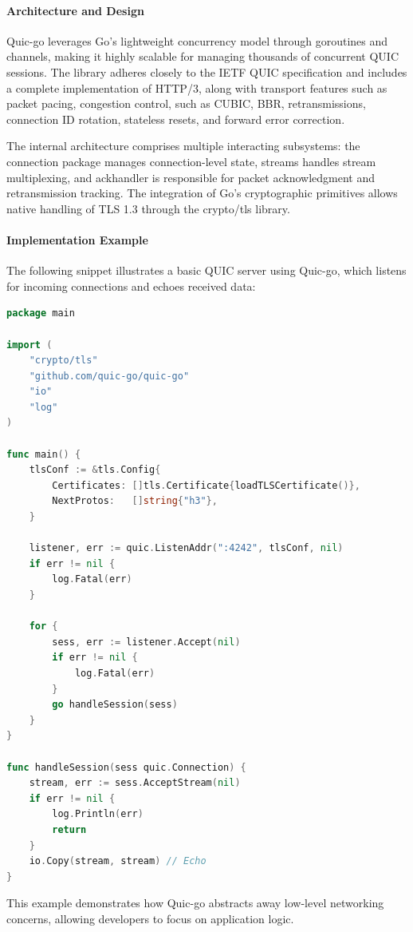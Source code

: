 \paragraph{Architecture and Design}
Quic-go leverages Go's lightweight concurrency model through goroutines and channels, making it highly scalable for managing thousands of concurrent QUIC sessions. The library adheres closely to the IETF QUIC specification and includes a complete implementation of HTTP/3, along with transport features such as packet pacing, congestion control, such as CUBIC, BBR, retransmissions, connection ID rotation, stateless resets, and forward error correction.

The internal architecture comprises multiple interacting subsystems: the connection package manages connection-level state, streams handles stream multiplexing, and ackhandler is responsible for packet acknowledgment and retransmission tracking. The integration of Go's cryptographic primitives allows native handling of TLS 1.3 through the crypto/tls library.

\paragraph{Implementation Example}
The following snippet illustrates a basic QUIC server using Quic-go, which listens for incoming connections and echoes received data:

\begin{lstlisting}[language=go]
package main

import (
    "crypto/tls"
    "github.com/quic-go/quic-go"
    "io"
    "log"
)

func main() {
    tlsConf := &tls.Config{
        Certificates: []tls.Certificate{loadTLSCertificate()},
        NextProtos:   []string{"h3"},
    }

    listener, err := quic.ListenAddr(":4242", tlsConf, nil)
    if err != nil {
        log.Fatal(err)
    }

    for {
        sess, err := listener.Accept(nil)
        if err != nil {
            log.Fatal(err)
        }
        go handleSession(sess)
    }
}

func handleSession(sess quic.Connection) {
    stream, err := sess.AcceptStream(nil)
    if err != nil {
        log.Println(err)
        return
    }
    io.Copy(stream, stream) // Echo
}
\end{lstlisting}

This example demonstrates how Quic-go abstracts away low-level networking concerns, allowing developers to focus on application logic.

